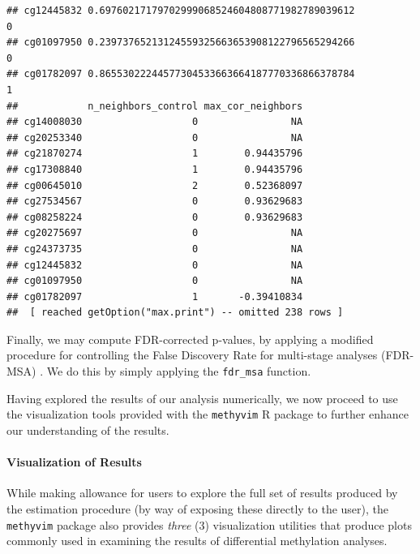 \documentclass[9pt,a4paper,]{extarticle}
\newenvironment{Shaded}{\begin{snugshade}}{\end{snugshade}}
\newcommand{\DataTypeTok}[1]{\textcolor[rgb]{0.13,0.29,0.53}{#1}}
\newcommand{\KeywordTok}[1]{\textcolor[rgb]{0.13,0.29,0.53}{\textbf{#1}}}
\newcommand{\NormalTok}[1]{#1}
\newcommand{\OperatorTok}[1]{\textcolor[rgb]{0.81,0.36,0.00}{\textbf{#1}}}
\newcommand{\StringTok}[1]{\textcolor[rgb]{0.31,0.60,0.02}{#1}}
\theoremstyle{definition}
\theoremstyle{definition}
\theoremstyle{definition}
\theoremstyle{remark}
\begin{document}
\begin{verbatim}
## cg12445832 0.69760217179702999068524604808771982789039612           0
## cg01097950 0.23973765213124559325663653908122796565294266           0
## cg01782097 0.86553022244577304533663664187770336866378784           1
##            n_neighbors_control max_cor_neighbors
## cg14008030                   0                NA
## cg20253340                   0                NA
## cg21870274                   1        0.94435796
## cg17308840                   1        0.94435796
## cg00645010                   2        0.52368097
## cg27534567                   0        0.93629683
## cg08258224                   0        0.93629683
## cg20275697                   0                NA
## cg24373735                   0                NA
## cg12445832                   0                NA
## cg01097950                   0                NA
## cg01782097                   1       -0.39410834
##  [ reached getOption("max.print") -- omitted 238 rows ]
\end{verbatim}

Finally, we may compute FDR-corrected p-values, by applying a modified procedure
for controlling the False Discovery Rate for multi-stage analyses (FDR-MSA)
\citep{tuglus2009modified}. We do this by simply applying the \texttt{fdr\_msa} function.

\begin{Shaded}
\end{Shaded}

Having explored the results of our analysis numerically, we now proceed to use
the visualization tools provided with the \texttt{methyvim} R package to further
enhance our understanding of the results.

\hypertarget{visualization-of-results}{%
\paragraph{Visualization of Results}\label{visualization-of-results}}

While making allowance for users to explore the full set of results produced by
the estimation procedure (by way of exposing these directly to the user), the
\texttt{methyvim} package also provides \emph{three} (3) visualization utilities that
produce plots commonly used in examining the results of differential methylation
analyses.
\end{document}
